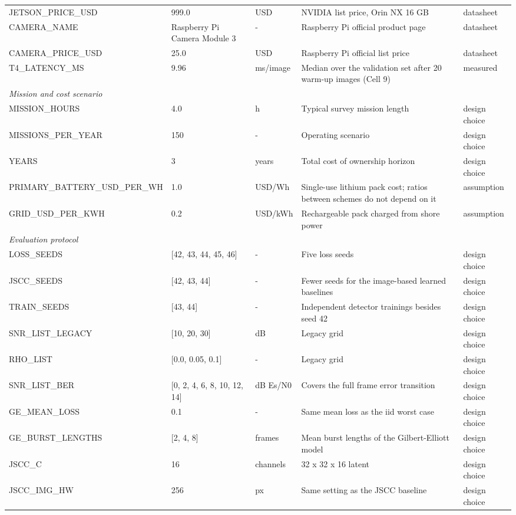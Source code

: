 \begin{table}[t]
\begin{tabular}{p{3.3cm}p{2.6cm}p{1.6cm}p{6.6cm}p{2.0cm}}
JETSON\_PRICE\_USD & 999.0 & USD & NVIDIA list price, Orin NX 16 GB & datasheet \\
CAMERA\_NAME & Raspberry Pi Camera Module 3 & - & Raspberry Pi official product page & datasheet \\
CAMERA\_PRICE\_USD & 25.0 & USD & Raspberry Pi official list price & datasheet \\
T4\_LATENCY\_MS & 9.96 & ms/image & Median over the validation set after 20 warm-up images (Cell 9) & measured \\
\multicolumn{5}{l}{\textit{Mission and cost scenario}} \\
MISSION\_HOURS & 4.0 & h & Typical survey mission length & design choice \\
MISSIONS\_PER\_YEAR & 150 & - & Operating scenario & design choice \\
YEARS & 3 & years & Total cost of ownership horizon & design choice \\
PRIMARY\_BATTERY\_USD\_PER\_WH & 1.0 & USD/Wh & Single-use lithium pack cost; ratios between schemes do not depend on it & assumption \\
GRID\_USD\_PER\_KWH & 0.2 & USD/kWh & Rechargeable pack charged from shore power & assumption \\
\multicolumn{5}{l}{\textit{Evaluation protocol}} \\
LOSS\_SEEDS & [42, 43, 44, 45, 46] & - & Five loss seeds & design choice \\
JSCC\_SEEDS & [42, 43, 44] & - & Fewer seeds for the image-based learned baselines & design choice \\
TRAIN\_SEEDS & [43, 44] & - & Independent detector trainings besides seed 42 & design choice \\
SNR\_LIST\_LEGACY & [10, 20, 30] & dB & Legacy grid & design choice \\
RHO\_LIST & [0.0, 0.05, 0.1] & - & Legacy grid & design choice \\
SNR\_LIST\_BER & [0, 2, 4, 6, 8, 10, 12, 14] & dB Es/N0 & Covers the full frame error transition & design choice \\
GE\_MEAN\_LOSS & 0.1 & - & Same mean loss as the iid worst case & design choice \\
GE\_BURST\_LENGTHS & [2, 4, 8] & frames & Mean burst lengths of the Gilbert-Elliott model & design choice \\
JSCC\_C & 16 & channels & 32 x 32 x 16 latent & design choice \\
JSCC\_IMG\_HW & 256 & px & Same setting as the JSCC baseline & design choice \\

\end{tabular}
\end{table}
